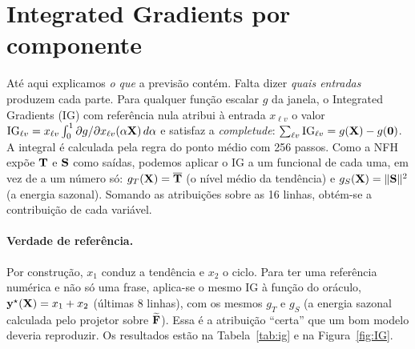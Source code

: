 \documentclass[11pt,a4paper]{article}
\begin{document}
\section{Integrated Gradients por componente}\label{sec:ig}

Até aqui explicamos \emph{o que} a previsão contém. Falta dizer \emph{quais entradas} produzem cada parte. Para qualquer função escalar $g$ da janela, o Integrated Gradients (IG) com referência nula atribui à entrada $x_{\ell v}$ o valor $\mathrm{IG}_{\ell v}=x_{\ell v}\int_0^1\partial g/\partial x_{\ell v}(\alpha\mathbf{X})\,d\alpha$ e satisfaz a \emph{completude}: $\sum_{\ell v}\mathrm{IG}_{\ell v}=g(\mathbf{X})-g(\mathbf 0)$. A integral é calculada pela regra do ponto médio com 256 passos. Como a NFH expõe $\mathbf{T}$ e $\mathbf{S}$ como saídas, podemos aplicar o IG a um funcional de cada uma, em vez de a um número só: $g_T(\mathbf{X})=\overline{\mathbf{T}}$ (o nível médio da tendência) e $g_S(\mathbf{X})=\|\mathbf{S}\|^2$ (a energia sazonal). Somando as atribuições sobre as 16 linhas, obtém-se a contribuição de cada variável.

\paragraph{Verdade de referência.} Por construção, $x_1$ conduz a tendência e $x_2$ o ciclo. Para ter uma referência numérica e não só uma frase, aplica-se o mesmo IG à função do oráculo, $\mathbf y^\star(\mathbf{X})=x_1+x_2$ (últimas 8 linhas), com os mesmos $g_T$ e $g_S$ (a energia sazonal calculada pelo projetor sobre $\widetilde{\mathbf{F}}$). Essa é a atribuição ``certa'' que um bom modelo deveria reproduzir. Os resultados estão na Tabela~\ref{tab:ig} e na Figura~\ref{fig:IG}.
\end{document}
